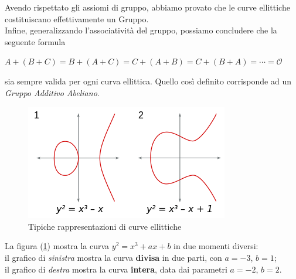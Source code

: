 \documentclass[a4paper,12pt]{tesiinfo}
\begin{document}
Avendo rispettato gli assiomi di gruppo, abbiamo provato che le curve ellittiche costituiscano effettivamente un Gruppo.
\\
Infine, generalizzando l'associativit\`a del gruppo, possiamo concludere che la seguente formula
\begin{center}
$A+(B+C)=B+(A+C)=C+(A+B)=C+(B+A)=\cdots = \mathcal{O}$
\end{center}
sia sempre valida per ogni curva ellittica. Quello cos\`i definito corrisponde ad un \textit{Gruppo Additivo Abeliano}.
\begin{figure}[H]
 \includegraphics[width=\textwidth,center]{CommonEC}
 \caption{Tipiche rappresentazioni di curve ellittiche}
 \label{CommonEC}
\end{figure}
La figura (\ref{CommonEC}) mostra la curva $y^2 = x^3 + ax+b$ in due momenti diversi: 
\\il grafico di \textit{sinistra} mostra la curva \textbf{divisa} in due parti, con $a=-3$, $b=1$; 
\\il grafico di \textit{destra} mostra la curva \textbf{intera}, data dai parametri $a=-2$, $b=2$.
%
%
%
%
%
%
%
%
%
%
%
\end{document}
